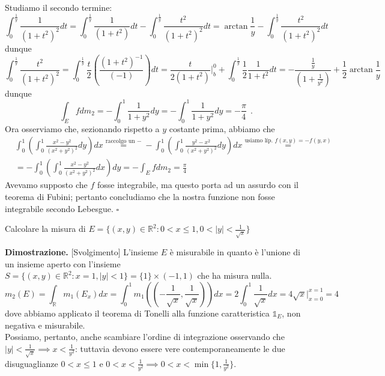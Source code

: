 	Studiamo il secondo termine:
	\[ \int_0^{\frac{1}{y}} \frac{1}{(1+t^2)^2} dt = \int_0^{\frac{1}{y}} \frac{1}{(1+t^2)}dt - \int_0^{\frac{1}{y}} \frac{t^2}{(1+t^2)^2} dt = \arctan{\frac{1}{y}} - \int_0^{\frac{1}{y}} \frac{t^2}{(1+t^2)^2}dt \]
	dunque
	\[\int_0^{\frac{1}{y}} \frac{t^2}{(1+t^2)^2} = \int_0^{\frac{1}{y}} \frac{t}{2}(\frac{(1+t^2)^{-1}}{(-1)})dt = \frac{t}{2(1+t^2)}|_b^0 + \int_0^{\frac{1}{y}} \frac{1}{2} \frac{1}{1+t^2}dt = -\frac{\frac{1}{y}}{(1+\frac{1}{y^2})} + \frac{1}{2}\arctan{\frac{1}{y}}\]
	dunque
	\[\int_E fdm_2 = - \int_0^1 \frac{1}{1+y^2}dy = - \int_0^1 \frac{1}{1+y^2}dy = - \frac{\pi}{4}\ \ . \]
	Ora osserviamo che, sezionando rispetto a $y$ costante prima, abbiamo che
	\[\begin{aligned}
	&\int_0^1 \left( \int_0^1 \frac{x^2-y^2}{(x^2 + y^2)^2}dy \right)dx \stackrel{\text{raccolgo un } -}{=} - \int_0^1 \left( \int_0^1 \frac{y^2 - x^2}{(x^2 + y^2)^2} dy \right)dx \stackrel{\text{usiamo l\'ip. } f(x,y)=-f(y,x)}{=} \\
	&= -\int_0^1 \left(\int_0^1 \frac{x^2-y^2}{(x^2 + y^2)^2} dx \right)dy = - \int_E fdm_2 = \frac{\pi}{4} 
	\end{aligned}\]
	Avevamo supposto che $f$ fosse integrabile, ma questo porta ad un assurdo con il teorema di Fubini; pertanto concludiamo che la nostra funzione non fosse integrabile secondo Lebesgue.
\hfill $\square$
%
\vspace{0.5cm}
\begin{exercise}
	Calcolare la misura di $E=\{(x, y) \in \mathbb{R}^2: 0 < x \leq 1, 0 < |y| < \frac{1}{\sqrt{x}} \}$
\end{exercise}
%
\noindent \textbf{Dimostrazione. }[Svolgimento]
	L'insieme $E$ è misurabile in quanto è l'unione di un insieme aperto con l'insieme $S=\{(x, y) \in \mathbb{R}^2 : x=1, |y| < 1 \} = \{1\} \times (-1, 1)$ che ha misura nulla. \\
	$$
	m_2(E) = \int_{\mathbb{R}} m_1(E_x)dx = \int_0^1 m_1\left( \left(-\frac{1}{\sqrt{x}}, \frac{1}{\sqrt{x}} \right) \right)dx = 2 \int_0^1 \frac{1}{\sqrt{x}}dx = 4\sqrt{x}\Bigg|^{x=1}_{x=0} = 4
	$$
	dove abbiamo applicato il teorema di Tonelli alla funzione caratteristica $\mathbb{1}_E$, non negativa e misurabile. \\
	Possiamo, pertanto, anche scambiare l'ordine di integrazione osservando che $|y| < \frac{1}{\sqrt{x}} \implies x < \frac{1}{y^2}$: tuttavia devono essere vere contemporaneamente le due disuguaglianze $0 < x \leq 1$ e $0 < x < \frac{1}{y^2} \implies 0 < x < \min\{1, \frac{1}{y^2}\}$. 
